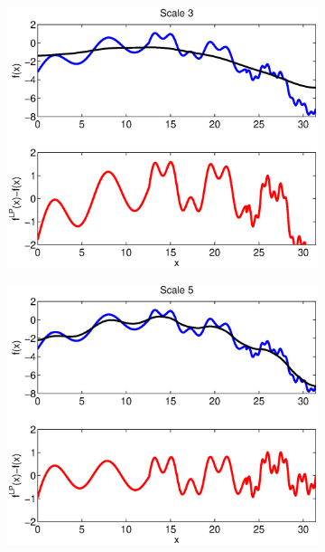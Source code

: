\begin{figure}[t]
\centering
\begin{subfigure}{0.22\textwidth}
\includegraphics[width=\textwidth]{Scale3_S2}
\caption{}
\label{subfig:LP_ex1}
\end{subfigure}
\begin{subfigure}{0.22\textwidth}
\includegraphics[width=\textwidth]{Scale5_S2}
\caption{}
\label{subfig:LP_ex2}
\end{subfigure}
\begin{subfigure}{0.22\textwidth}

\end{subfigure}
\end{figure}
